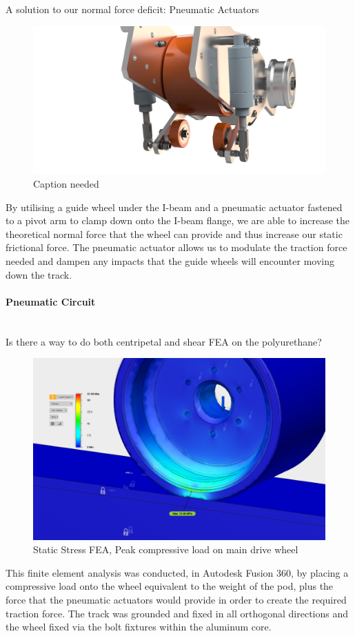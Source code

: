 \documentclass{report}
\let\oldparagraph\paragraph
\renewcommand{\paragraph}[1]{\oldparagraph{#1}\mbox{}\\}
\begin{document}
    A solution to our normal force deficit: Pneumatic Actuators
    \begin{figure}[H]
        \centering
        \includegraphics[width=\linewidth]{fig20}
        \caption{Caption needed}
    \end{figure}
    By utilising a guide wheel under the I-beam and a pneumatic actuator fastened to a pivot arm to clamp down onto the I-beam flange, we are able to increase the theoretical normal force that the wheel can provide and thus increase our static frictional force. The pneumatic actuator allows us to modulate the traction force needed and dampen any impacts that the guide wheels will encounter moving down the track.
    
    \paragraph{Pneumatic Circuit}
    Is there a way to do both centripetal and shear FEA on the polyurethane?\\
    \begin{figure}[H]
        \centering
        \includegraphics[width=\linewidth]{fig21}
        \caption{Static Stress FEA, Peak compressive load on main drive wheel}
    \end{figure}
    This finite element analysis was conducted, in Autodesk Fusion 360, by placing a compressive load onto the wheel equivalent to the weight of the pod, plus the force that the pneumatic actuators would provide in order to create the required traction force. The track was grounded and fixed in all orthogonal directions and the wheel fixed via the bolt fixtures within the aluminum core.\\
    
\end{document}
